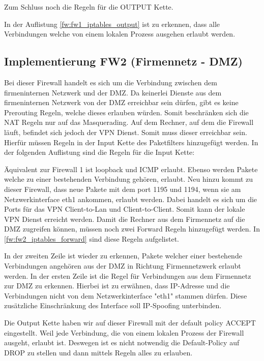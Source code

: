Zum Schluss noch die Regeln für die OUTPUT Kette.

In der Auflistung \ref{fw:fw1_iptables_output} ist zu erkennen, dass alle Verbindungen welche von einem lokalen Prozess ausgehen erlaubt werden.

\subsection{Implementierung FW2 (Firmennetz - DMZ)}
Bei dieser Firewall handelt es sich um die Verbindung zwischen dem firmeninternen Netzwerk und der DMZ. Da keinerlei Dienste aus dem firmeninternen Netzwerk von der DMZ erreichbar sein dürfen, gibt es keine Prerouting Regeln, welche dieses erlauben würden. Somit beschränken sich die NAT Regeln nur auf das Masquerading. 
Auf dem Rechner, auf dem die Firewall läuft, befindet sich jedoch der VPN Dienst. Somit muss dieser erreichbar sein. Hierfür müssen Regeln in der Input Kette des Paketfilters hinzugefügt werden. In der folgenden Auflistung sind die Regeln für die Input Kette:

Äquivalent zur Firewall 1 ist loopback und ICMP erlaubt. Ebenso werden Pakete welche zu einer bestehenden Verbindung gehören, erlaubt. Neu hinzu kommt zu dieser Firewall, dass neue Pakete mit dem port 1195 und 1194, wenn sie am Netzwerkinterface eth1 ankommen, erlaubt werden. Dabei handelt es sich um die Ports für das VPN Client-to-Lan und Client-to-Client. Somit kann der lokale VPN Dienst erreicht werden.
Damit die Rechner aus dem Firmennetz auf die DMZ zugreifen können, müssen noch zwei Forward Regeln hinzugefügt werden. In \ref{fw:fw2_iptables_forward} sind diese Regeln aufgelistet.

In der zweiten Zeile ist wieder zu erkennen, Pakete welcher einer bestehende Verbindungen angehören aus der DMZ in Richtung Firmennetzwerk erlaubt werden. In der ersten Zeile ist die Regel für Verbindungen aus dem Firmennetz zur DMZ zu erkennen. Hierbei ist zu erwähnen, dass IP-Adresse und die Verbindungen nicht von dem Netzwerkinterface "eth1" stammen dürfen. Diese zusätzliche Einschränkung des Interface soll IP-Spoofing unterbinden.

Die Output Kette haben wir auf dieser Firewall mit der default policy ACCEPT eingestellt. Weil jede Verbindung, die von einem lokalen Prozess der Firewall ausgeht, erlaubt ist. Deswegen ist es nicht notwendig die Default-Policy auf DROP zu stellen und dann mittels Regeln alles zu erlauben.
